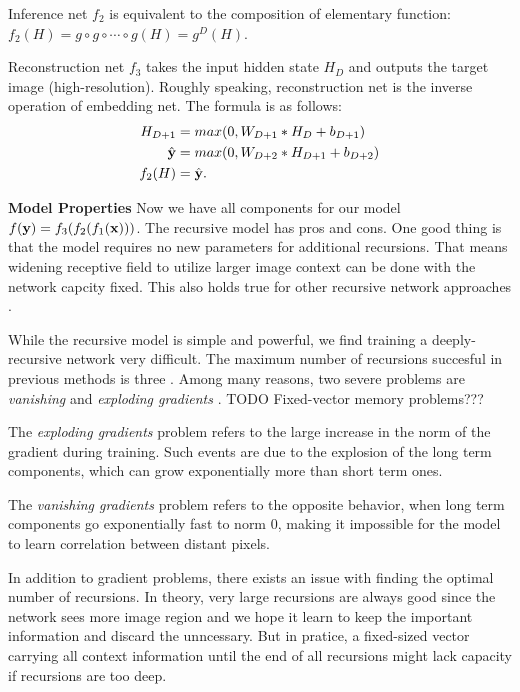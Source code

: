 \documentclass[10pt,twocolumn,letterpaper]{article}
\begin{document}
Inference net $f_2$ is equivalent to the composition of elementary function: $f_2(H) = g \circ g \circ \cdots \circ g(H) =  g^{D}(H)$. 

Reconstruction net $f_3$ takes the input hidden state $H_D$ and outputs the target image (high-resolution). Roughly speaking, reconstruction net is the inverse operation of embedding net. The formula is as follows:
\begin{align}
	H_{D+1} &= max(0, W_{D+1}*H_D + b_{D+1})\\
	\hat{{\bf y}} &= max(0, W_{D+2}*H_{D+1} + b_{D+2})\\
	f_2(H) &= \hat{{\bf y}}.
\end{align}

\textbf{Model Properties} Now we have all components for our model $f({\bf y}) = f_3(f_2 (f_1({\bf x})))$. The recursive model has pros and cons. One good thing is that the model requires no new parameters for additional recursions. That means widening receptive field to utilize larger image context can be done with the network capcity fixed. This also holds true for other recursive network approaches \cite{Liang_2015_CVPR}.  

While the recursive model is simple and powerful, we find training a deeply-recursive network very difficult. The maximum number of recursions succesful in previous methods is three \cite{Liang_2015_CVPR}.  Among many reasons, two severe problems are \textit{vanishing} and \textit{exploding gradients} \cite{bengio1994learning, pascanu2013difficulty}.   TODO Fixed-vector memory problems???

The \textit{exploding gradients} problem refers to the large increase in the norm
of the gradient during training. Such events are due to
the explosion of the long term components, which can grow exponentially more than short term ones.  


The
\textit{vanishing gradients} problem refers to the opposite behavior,
when long term components go exponentially
fast to norm 0, making it impossible for the model to
learn correlation between distant pixels.

In addition to gradient problems, there exists an issue with finding the optimal number of recursions. In theory, very large recursions are always good since the network sees more image region and we hope it learn to keep the important information and discard the unncessary.  But in pratice, a fixed-sized vector carrying all context information until the end of all recursions might lack capacity if recursions are too deep. 
\end{document}
